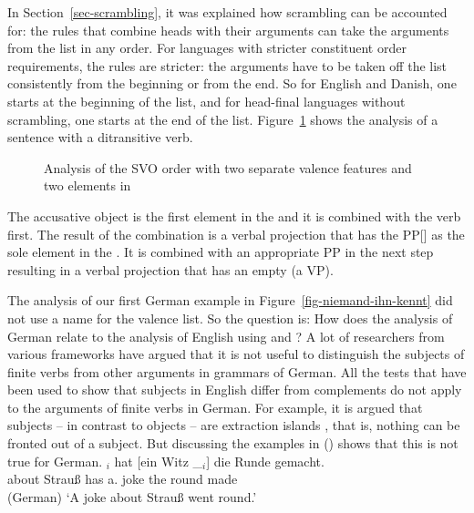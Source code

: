 In Section~\ref{sec-scrambling}, it was explained how scrambling can be accounted for: the rules that
combine heads with their arguments can take the arguments from the list in any order. For languages
with stricter constituent order requirements, the rules are stricter: the arguments have to be taken
off the list consistently from the beginning or from the end. So for English and Danish, one starts
at the beginning of the list, and for head-final languages without scrambling, one starts at the end
of the list. Figure~\ref{fig-svo-ditrans} shows the analysis of a sentence with a ditransitive verb.
\begin{figure}
\caption{\label{fig-svo-ditrans}Analysis of the SVO order with two separate valence features and two
  elements in \comps}
\end{figure}
The accusative object is the first element in the \compsl and it is combined with the verb
first. The result of the combination is a verbal projection that has the PP[] as the sole
element in the \compsl. It is combined with an appropriate PP in the next step resulting in a verbal
projection that has an empty \compsl (a VP).


The analysis of our first German example in Figure~\ref{fig-niemand-ihn-kennt} did not use a name
for the valence list. So the question is: How does the analysis of German relate to the analysis of
English using \spr and \comps? A lot of researchers from various frameworks have argued that it is not
useful to distinguish the subjects of finite verbs from other arguments in grammars of German. All the tests that have
been used to show that subjects in English differ from complements do not apply to the arguments of
finite verbs in German. For example, it is argued that subjects – in contrast to objects – are
extraction islands \parencites[--250]{Chomsky73a}[]{Fanselow87a}[--36]{Grewendorf89a}, that is, nothing can be
fronted out of a subject. But \citet[]{Haider93a} discussing the examples in () shows that this is not true for
German.
\eal
\ex 
{}$_i$ hat [ein        Witz \_$_i$] die Runde gemacht.\\
     \spacebr{}about Strauß      has \spacebr{}a.\NOM{} joke {}      the round made\\\hfill(German)
\glt `A joke about Strauß went round.'


